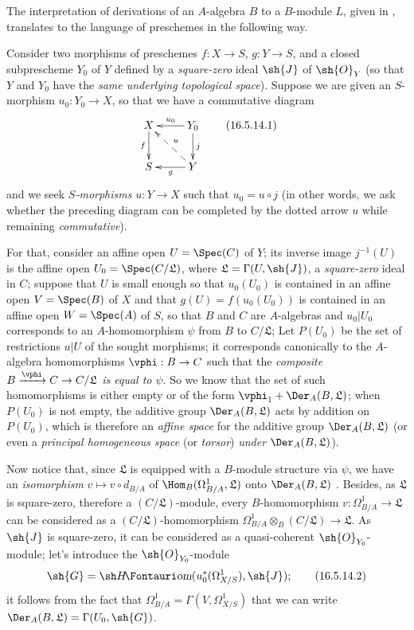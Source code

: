 \begin{env}[16.5.14]
\label{IV.16.5.14}
The interpretation of derivations of an $A$-algebra $B$ to a $B$-module $L$, given in , translates to the language of preschemes in the following way.

Consider two morphisms of preschemes $f : X \to S$, $g : Y \to S$, and a closed subprescheme $Y_0$ of $Y$ defined by a \emph{square-zero} ideal $\sh{J}$ of $\sh{O}_Y$ (so that $Y$ and $Y_0$ have the \emph{same underlying topological space}).
Suppose we are given an $S$-morphism $u_0 : Y_0 \to X$, so that we have a commutative diagram
\[
\label{IV.16.5.14.1}
  \xymatrix{
    X \ar[d]_-f & Y_0 \ar[l]_-{u_0}\ar[d]^j \\
    S & Y \ar@{-->}[ul]_-u \ar[l]^-g
  }
  \tag{16.5.14.1}
\]
and we seek \emph{$S$-morphisms} $u : Y \to X$ such that $u_0 = u \circ j$ (in other words, we ask whether the preceding diagram can be completed by the dotted arrow $u$ while remaining \emph{commutative}).

For that, consider an affine open $U = \Spec(C)$ of $Y$;
its inverse image $j^{-1}(U)$ is the affine open $U_0 = \Spec(C/\mathfrak{L})$, where $\mathfrak{L} = \Gamma(U, \sh{J})$, a \emph{square-zero} ideal in $C$;
suppose that $U$ is small enough so that $u_0(U_0)$ is contained in an affine open $V = \Spec(B)$ of $X$ and that $g(U) = f(u_0(U_0))$ is contained in an affine open $W = \Spec(A)$ of $S$, so that $B$ and $C$ are $A$-algebras and $u_0|U_0$ corresponds to an $A$-homomorphism $\psi$ from $B$ to $C/\mathfrak{L}$;
Let $P(U_0)$ be the set of restrictions $u|U$ of the sought morphisms; it corresponds canonically to the $A$-algebra homomorphisms $\vphi : B \to C$ such that the \emph{composite $B \xrightarrow{\vphi} C \to C/\mathfrak{L}$ is equal to $\psi$}.
So we know  that the set of such homomorphisms is either empty or of the form $\vphi_1 + \Der_A(B, \mathfrak{L})$;
when $P(U_0)$ is not empty, the additive group $\Der_A(B, \mathfrak{L})$ acts by addition on $P(U_0)$, which is therefore an \emph{affine space} for the additive group $\Der_A(B, \mathfrak{L})$ (or even a \emph{principal homogeneous space} (or \emph{torsor}) \emph{under} $\Der_A(B, \mathfrak{L})$).

Now notice that, since $\mathfrak{L}$ is equipped with a $B$-module structure via $\psi$, we have an \emph{isomorphism} $v \mapsto v \circ d_{B/A}$ of $\Hom_B(\Omega_{B/A}^1, \mathfrak{L})$ onto $\Der_A(B, \mathfrak{L})$ .
Besides, as $\mathfrak{L}$ is square-zero, therefore a $(C/\mathfrak{L})$-module, every $B$-homomorphism $v : \Omega_{B/A}^1 \to \mathfrak{L}$ can be considered as a $(C/\mathfrak{L})$-homomorphism $\Omega_{B/A}^1 \otimes_B (C/\mathfrak{L}) \to \mathfrak{L}$.
As $\sh{J}$ is square-zero, it can be considered as a quasi-coherent $\sh{O}_{Y_0}$-module;
let's introduce the $\sh{O}_{Y_0}$-module
\[
\label{IV.16.5.14.2}
  \sh{G} = \shHom(u_0^*(\Omega_{X/S}^1), \sh{J});
  \tag{16.5.14.2}
\]
it follows from the fact that $\Omega_{B/A}^1 = \Gamma(V, \Omega_{X/S}^1)$  that we can write $\Der_A(B, \mathfrak{L}) = \Gamma(U_0, \sh{G})$.


\end{env}
